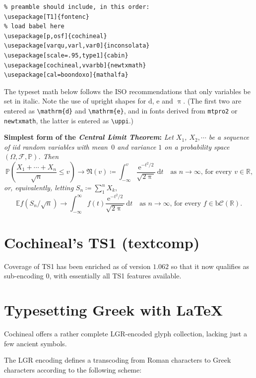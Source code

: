 \documentclass[11pt]{article}
\begin{document}
\begin{verbatim}
% preamble should include, in this order:
\usepackage[T1]{fontenc}
% load babel here
\usepackage[p,osf]{cochineal}
\usepackage[varqu,varl,var0]{inconsolata}
\usepackage[scale=.95,type1]{cabin}
\usepackage[cochineal,vvarbb]{newtxmath}
\usepackage[cal=boondoxo]{mathalfa}
\end{verbatim}
\def\Pr{\ensuremath{\mathbb{P}}}
\def\d{\mathrm{d}}
The typeset math below follows the ISO recommendations that only variables
be set in italic. Note the use of upright shapes for $\d$, $\mathrm{e}$
and $\uppi$. (The first two are entered as \verb|\mathrm{d}| and
\verb|\mathrm{e}|, and in fonts derived from {\tt mtpro2} or {\tt newtxmath},
 the latter is entered as \verb|\uppi|.)

\textbf{Simplest form of the \textit{Central Limit Theorem}:} \textit{Let
$X_1$, $X_2,\cdots$ be a sequence of iid random variables with mean~$0$ 
and variance $1$ on a probability space $(\Omega,\mathcal{F},\Pr)$. Then}
\[\Pr\left(\frac{X_1+\cdots+X_n}{\sqrt{n}}\le v\right)\to\mathfrak{N}(v)\coloneq
\int_{-\infty}^v \frac{\mathrm{e}^{-t^2/2}}{\sqrt{2\uppi}}\,
\mathrm{d}t\quad\mbox{as $n\to\infty$, for every $v\in\mathbb{R}$,}\]
\textit{or, equivalently, letting} $S_n\coloneq\sum_1^n X_k$,
\[\mathbb{E} f\left(S_n/\sqrt{n}\right)\to \int_{-\infty}^\infty f(t)
\frac{\mathrm{e}^{-t^2/2}}{\sqrt{2\uppi}}\,\mathrm{d}t
\quad\mbox{as $n\to\infty$, for every $f\in\mathrm{b}
\mathcal{C}(\mathbb{R})$.}\]
\newpage

\section*{Cochineal's TS1 (textcomp)}
Coverage of TS1 has been enriched as of version $1.062$ so that it now qualifies as sub-encoding $0$, with essentially all TS1 features available.

\newpage
 \section*{Typesetting Greek with LaTeX}
Cochineal offers a rather complete LGR-encoded glyph collection, lacking just a few ancient symbols.

The LGR encoding defines a transcoding from Roman characters to Greek characters according to the following scheme:
\end{document}
